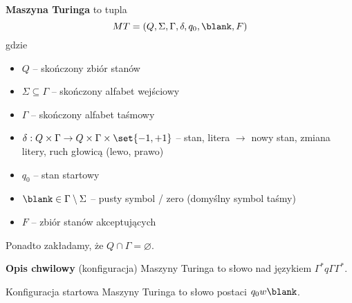 \label{dmt}
\begin{definition}

 \textbf{Maszyna Turinga} to tupla
    \[
        MT = (Q, \Sigma, \Gamma, \delta, q_0, \blank, F)
    \]
    gdzie
    \begin{itemize}
        \item \( Q \) -- skończony zbiór stanów
        \item \( \Sigma \subseteq \Gamma \) -- skończony alfabet wejściowy
        \item \( \Gamma \) -- skończony alfabet taśmowy
        \item \( \delta : Q \times \Gamma \rightarrow 
        Q \times \Gamma \times \set{-1, +1}
        \) -- stan, litera \( \rightarrow \) nowy stan, zmiana litery, ruch głowicą (lewo, prawo)
        \item \( q_0 \) -- stan startowy
        \item \( \blank \in \Gamma \setminus \Sigma \) -- pusty symbol / zero (domyślny symbol taśmy)
        \item \( F \) -- zbiór stanów akceptujących
    \end{itemize}
    
    Ponadto zakładamy, że \(Q \cap \Gamma = \varnothing\). 
\end{definition}

\begin{definition}
    \textbf{Opis chwilowy} (konfiguracja) Maszyny Turinga to słowo nad językiem \(\Gamma^* q\Gamma \Gamma^* \). 
\end{definition}

\begin{definition}
    Konfiguracja startowa Maszyny Turinga to słowo postaci \(q_0w\blank\).
\end{definition}


